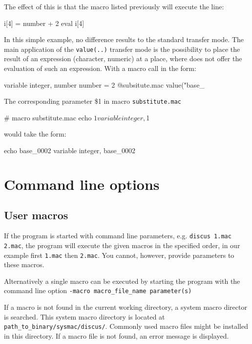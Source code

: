The effect of this is that the macro listed previously will 
execute the line:
\begin{MacVerbatim}
     i[4] = number + 2
     eval i[4]
\end{MacVerbatim}
In this simple example, no difference results to the standard transfer
mode. The main application of the {\tt value(..)} transfer mode is the
possibility to place the result of an expression (character, numeric)
at a place, where \Suite does not offer the evaluation of such an
expression. With a macro call in the form:
\begin{MacVerbatim}
     variable integer, number
     number = 2
     @subsitute.mac value("base_%
\end{MacVerbatim}

The corresponding parameter \$1 in macro {\tt substitute.mac} 
\begin{MacVerbatim}
   # macro substitute.mac
   echo $1
   variable integer, $1
\end{MacVerbatim}

would take the form:
\begin{MacVerbatim}
   echo base_0002
   variable integer, base_0002
\end{MacVerbatim}

\par

\section{Command line options \label{cmdopt}}

\subsection{User macros}
If the program is started with command line parameters,
e.g. {\tt discus 1.mac 2.mac}, the program will execute the given
macros in the specified order, in our example first {\tt 1.mac} then
{\tt 2.mac}. You cannot, however, provide parameters to these macros.

Alternatively a single macro can be executed by starting the program
with the command line option 
{\tt -macro macro\_file\_name parameter(s)}

If a macro is not found in the current working
directory, a system macro director is searched. This system macro
directory is located at {\tt path\_to\_binary/sysmac/discus/}.
Commonly used macro files might be installed in this directory.
If a macro file is not found, an error message is displayed.

